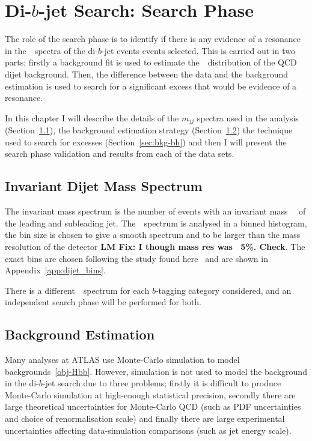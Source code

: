 \chapter{Di-$b$-jet Search: Search Phase}
\label{sec:bkg}

The role of the search phase is to identify
if there is any evidence of a resonance
in the~\mjj~spectra of the di-$b$-jet events events selected.
This is carried out in two parts;
firstly a background fit is used to estimate
the~\mjj~distribution of the QCD dijet background.
Then, the difference between the data
and the background estimation is used 
to search 
for a significant excess that would be evidence
of a resonance.

In this chapter
I will describe
the details of the $m_{jj}$ spectra used in the analysis
(Section~\ref{sec:bkg-mjj}),
the background estimation strategy
(Section~\ref{sec:bkg-fit})
the technique used to search for excesses
(Section~\ref{sec:bkg-bh})
and then I will present the search phase
validation and results from each of the data sets.

\section{Invariant Dijet Mass Spectrum}
\label{sec:bkg-mjj}

The invariant mass spectrum is the number of events
with an invariant mass~\mjj~
of the leading and subleading jet.
The~\mjj~spectrum is analysed in a binned histogram,
the bin size is chosen to give a smooth spectrum
and to be larger than the mass resolution of the detector \textbf{LM Fix: I though mass res was ~5\%. Check}.
The exact bins are chosen following the study found here~\cite{dijet-mori16_int}
and are shown in Appendix~\ref{app:dijet_bins}.

There is a different~\mjj~spectrum for each
$b$-tagging category considered,
and an independent search phase will be performed for both.



\section{Background Estimation}
\label{sec:bkg-fit}

Many analyses at ATLAS use Monte-Carlo simulation
to model backgrounds~\ref{obj-Hbb}.
However, simulation is not used to model the
background in the di-$b$-jet search due to three problems;
firstly it is difficult to produce Monte-Carlo simulation at high-enough statistical precision,
secondly there are large theoretical uncertainties for Monte-Carlo QCD
(such as PDF uncertainties and choice of renormalisation scale)
and finally there are large experimental uncertainties affecting
data-simulation comparisons (such as jet energy scale).

